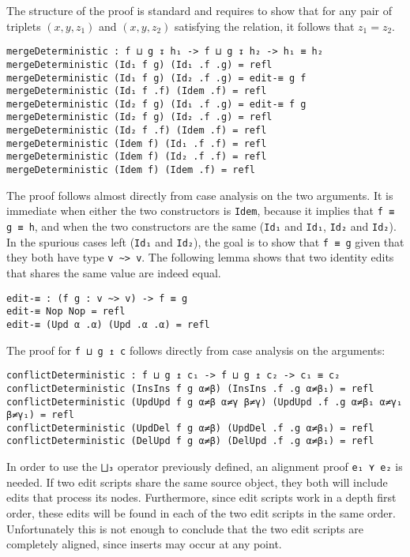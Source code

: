 \documentclass[../Thesis.tex]{subfiles}
\begin{document}
	The structure of the proof is standard and requires to show that for any 
	pair of triplets $(x, y, z_1)$ and $(x, y, z_2)$ satisfying
	the relation, it follows that $z_1 = z_2$.
	
\begin{verbatim}
mergeDeterministic : f ⊔ g ↧ h₁ -> f ⊔ g ↧ h₂ -> h₁ ≡ h₂
mergeDeterministic (Id₁ f g) (Id₁ .f .g) = refl
mergeDeterministic (Id₁ f g) (Id₂ .f .g) = edit-≡ g f
mergeDeterministic (Id₁ f .f) (Idem .f) = refl
mergeDeterministic (Id₂ f g) (Id₁ .f .g) = edit-≡ f g
mergeDeterministic (Id₂ f g) (Id₂ .f .g) = refl
mergeDeterministic (Id₂ f .f) (Idem .f) = refl
mergeDeterministic (Idem f) (Id₁ .f .f) = refl
mergeDeterministic (Idem f) (Id₂ .f .f) = refl
mergeDeterministic (Idem f) (Idem .f) = refl
\end{verbatim}

	The proof follows almost directly from case analysis on the two arguments.
	It is immediate when either the two constructors is \texttt{Idem}, because
	it implies that \texttt{f ≡ g ≡ h}, and when the two constructors are the 
	same (\texttt{Id₁} and \texttt{Id₁}, \texttt{Id₂} and \texttt{Id₂}).
	In the spurious cases left (\texttt{Id₁} and \texttt{Id₂}), the goal
	is to show that \texttt{f ≡ g} 
	given that they both have type \texttt{v \textasciitilde> v}.
	The following lemma shows that two identity edits that shares the same 
	value are indeed equal.
	
\begin{verbatim}
edit-≡ : (f g : v ~> v) -> f ≡ g
edit-≡ Nop Nop = refl
edit-≡ (Upd α .α) (Upd .α .α) = refl
\end{verbatim}	
	
	The proof for \texttt{f ⊔ g ↥ c} follows directly from case analysis on the 
	arguments:
	
\begin{verbatim}
conflictDeterministic : f ⊔ g ↥ c₁ -> f ⊔ g ↥ c₂ -> c₁ ≡ c₂
conflictDeterministic (InsIns f g α≠β) (InsIns .f .g α≠β₁) = refl
conflictDeterministic (UpdUpd f g α≠β α≠γ β≠γ) (UpdUpd .f .g α≠β₁ α≠γ₁ β≠γ₁) = refl
conflictDeterministic (UpdDel f g α≠β) (UpdDel .f .g α≠β₁) = refl
conflictDeterministic (DelUpd f g α≠β) (DelUpd .f .g α≠β₁) = refl
\end{verbatim}	


	In order to use the \texttt{⨆₃} operator previously defined, an alignment
	proof \texttt{e₁ ⋎ e₂} is needed.
	If two edit scripts share the same source object, they both will include 
	edits that process its nodes. Furthermore, since edit scripts work 
	in a depth first order, these edits will be found in each 
	of the two edit scripts in the same order.
	Unfortunately this is not enough to conclude that the two edit scripts 
	are completely aligned, since inserts may occur at any point.
		
\end{document}

